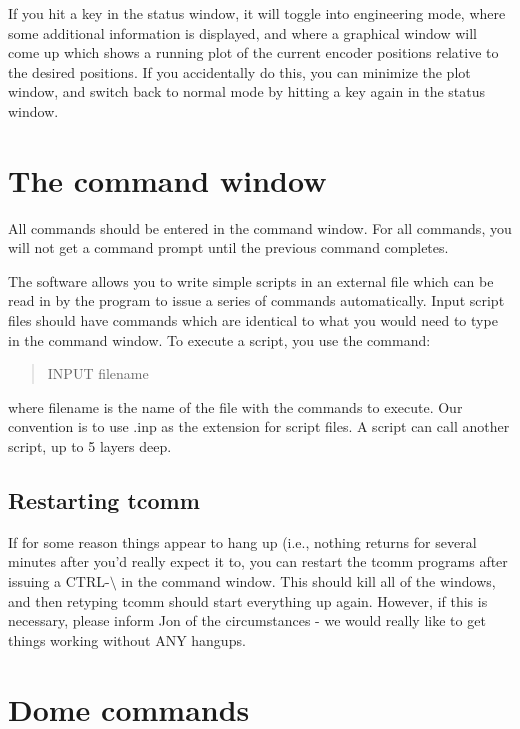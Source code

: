 \documentclass[10pt]{report}
\begin{document}
If you hit a key in the status window, it will toggle into engineering
mode, where some additional information is displayed, and where a
graphical window will come up which shows a running plot of the current 
encoder positions relative to the desired positions. If you accidentally
do this, you can minimize the plot window, and switch back to normal
mode by hitting a key again in the status window.

\section{The command window}

All commands should be entered in the command window. For all commands, 
you will not get a command prompt until the previous command completes.

The software allows you to write simple scripts in an external file which
can be read in by the program to issue a series of commands automatically.
Input script files should have commands which are identical to what you
would need to type in the command window. To execute a script, you use
the  command:

\begin{quote}
INPUT filename
\end{quote}

where filename is the name of the file with the commands to execute. Our 
convention is to use .inp as the extension for script files.
A script can call another script, up to 5 layers deep. 

\subsection{Restarting tcomm}

If for some reason things appear to hang up (i.e., nothing returns
for several minutes after you'd really expect it to, you can restart
the tcomm programs after issuing a CTRL-$\setminus$ in the command
window. This should kill all of the windows, and then retyping tcomm
should start everything up again. However, if this is necessary,
please inform Jon of the circumstances - we would really like to
get things working without ANY hangups.

\section{Dome commands}
\end{document}
